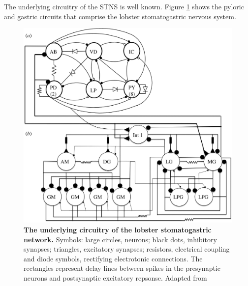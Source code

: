 The underlying circuitry of the \ac{STNS} is well known. Figure \ref{fig:stns_connectome} shows the pyloric and gastric circuits that comprise the lobster stomatogastric nervous system.

\begin{figure}[H]
	\centering
		\includegraphics[width=\columnwidth]{graphics/stns_connectome.png}
		\caption[The underlying circuitry of the lobster stomatogastric network.]{\textbf{The underlying circuitry of the lobster stomatogastric network.} Symbols: large circles, neurons; black dots, inhibitory synapses; triangles, excitatory synapses; resistors, electrical coupling and diode symbols,  rectifying electrotonic connections. The rectangles represent delay lines between spikes in the presynaptic neurons and postsynaptic excitatory repsonse. Adapted from \cite{Selverston2010}}
		\label{fig:stns_connectome}
\end{figure}

